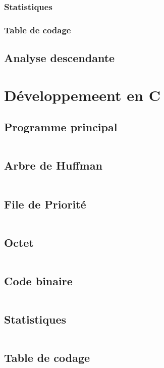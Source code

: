 \documentclass[12pt,a4paper]{article}
\begin{document}
\subsubsection{Statistiques}

\subsubsection{Table de codage}

\subsection{Analyse descendante}
%

\section{Développemeent en C}
\subsection{Programme principal}
    \inputminted[breaklines]{c}{../code/src/main.c}
\subsection{Arbre de Huffman}
    \inputminted[breaklines]{c}{../code/src/arbre.c}
\subsection{File de Priorité}
    \inputminted[breaklines]{c}{../code/src/fileDePriorite.c}
\subsection{Octet}
    \inputminted[breaklines]{c}{../code/src/octet.c}
\subsection{Code binaire}
    \inputminted[breaklines]{c}{../code/src/codeBinaire.c}
\subsection{Statistiques}
    \inputminted[breaklines]{c}{../code/src/stats.c}
\subsection{Table de codage}
    \inputminted[breaklines]{c}{../code/src/table.c}
\end{document}
